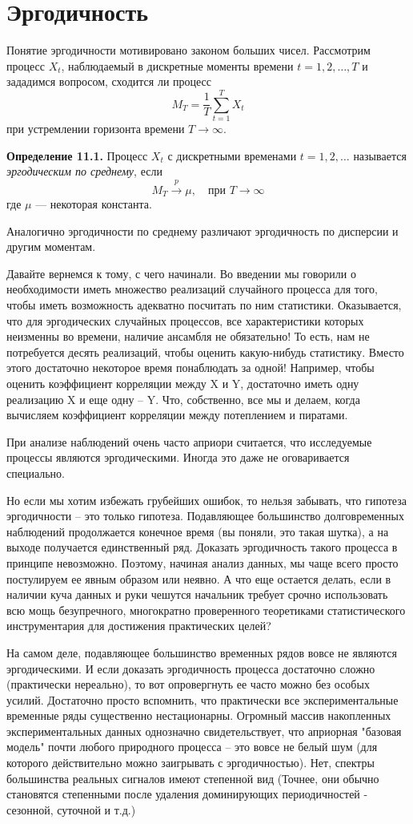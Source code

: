 \section{Эргодичность}
Понятие эргодичности мотивировано законом больших чисел. Рассмотрим процесс
$X_t$, наблюдаемый в дискретные моменты времени $t = 1, 2, \ldots, T$
и зададимся вопросом, сходится ли процесс \[ M_T = \frac{1}{T}
\sum_{t=1}^{T} X_t \] при устремлении горизонта времени $T \to
\infty$.

\textbf{Определение 11.1.} Процесс $X_t$ с дискретными
временами $t = 1, 2, \ldots$ называется \textit{эргодическим по
среднему}, если \[ M_T
\xrightarrow{p} \mu, \quad \text{при } T \to \infty \] где $\mu$ —
некоторая константа.

Аналогично эргодичности по среднему различают эргодичность по
дисперсии и другим моментам.

Давайте вернемся к тому, с чего начинали. Во введении мы говорили о
необходимости иметь множество реализаций случайного процесса для
того, чтобы иметь возможность адекватно посчитать по ним статистики.
Оказывается, что для эргодических случайных
процессов, все характеристики которых неизменны во времени, наличие
ансамбля не обязательно! То есть, нам не потребуется десять
реализаций, чтобы оценить какую-нибудь статистику. Вместо этого
достаточно некоторое время понаблюдать за одной! Например, чтобы
оценить коэффициент корреляции между X и Y, достаточно иметь одну
реализацию X и еще одну – Y. Что, собственно, все мы и делаем,
когда вычисляем коэффициент корреляции между потеплением и
пиратами.

При анализе наблюдений очень часто априори считается, что исследуемые
процессы являются эргодическими. Иногда это даже не оговаривается специально.

Но если мы хотим избежать грубейших ошибок, то нельзя забывать, что
гипотеза эргодичности – это только гипотеза. Подавляющее
большинство долговременных наблюдений продолжается конечное время
(вы поняли, это такая шутка), а на выходе получается единственный
ряд. Доказать эргодичность такого процесса в принципе невозможно.
Поэтому, начиная анализ данных, мы чаще всего просто постулируем ее
явным образом или неявно. А что еще остается делать, если в наличии
куча данных и руки чешутся начальник требует срочно использовать
всю мощь безупречного, многократно проверенного теоретиками
статистического инструментария для достижения практических целей?

На самом деле, подавляющее большинство временных рядов вовсе
не являются эргодическими. И если доказать эргодичность процесса
достаточно сложно (практически нереально), то вот
опровергнуть ее часто можно без особых усилий. Достаточно просто
вспомнить, что практически все экспериментальные временные ряды
существенно нестационарны. Огромный массив накопленных
экспериментальных данных однозначно свидетельствует, что априорная
"базовая модель" почти любого природного процесса – это вовсе не
белый шум (для которого действительно можно заигрывать с
эргодичностью). Нет, спектры большинства реальных сигналов имеют
степенной вид (Точнее, они обычно становятся степенными после
удаления доминирующих периодичностей - сезонной, суточной и т.д.)

